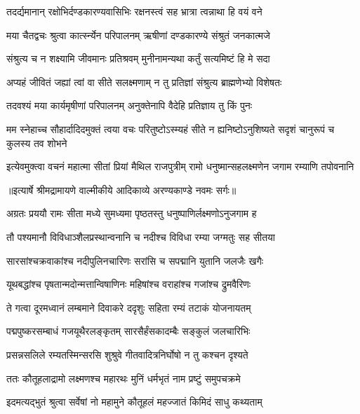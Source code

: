 \twolineshloka
{तदर्द्यमानान् रक्षोभिर्दण्डकारण्यवासिभिः}
{रक्षनस्त्वं सह भ्रात्रा त्वन्नाथा हि वयं वने} %

\twolineshloka
{मया चैतद्वचः श्रुत्वा कार्त्स्न्येन परिपालनम्}
{ऋषीणां दण्डकारण्ये संश्रुतं जनकात्मजे} %

\twolineshloka
{संश्रुत्य च न शक्ष्यामि जीवमानः प्रतिश्रवम्}
{मुनीनामन्यथा कर्तुं सत्यमिष्टं हि मे सदा} %

\twolineshloka
{अप्यहं जीवितं जह्यां त्वां वा सीते सलक्ष्मणाम्}
{न तु प्रतिज्ञां संश्रुत्य ब्राह्मणेभ्यो विशेषतः} %

\twolineshloka
{तदवश्यं मया कार्यमृषीणां परिपालनम्}
{अनुक्तेनापि वैदेहि प्रतिज्ञाय तु किं पुनः} %

\threelineshloka
{मम स्नेहाच्च सौहार्दादिदमुक्तं त्वया वचः}
{परितुष्टोऽस्म्यहं सीते न ह्यनिष्टोऽनुशिष्यते}
{सदृशं चानुरूपं च कुलस्य तव शोभने} %

\fourlineindentedshloka
{इत्येवमुक्त्वा वचनं महात्मा}
{सीतां प्रियां मैथिल राजपुत्रीम्}
{रामो धनुष्मान्सहलक्ष्मणेन}
{जगाम रम्याणि तपोवनानि} %


{॥इत्यार्षे श्रीमद्रामायणे वाल्मीकीये आदिकाव्ये अरण्यकाण्डे नवमः सर्गः॥}


\twolineshloka
{अग्रतः प्रययौ रामः सीता मध्ये सुमध्यमा}
{पृष्ठतस्तु धनुष्पाणिर्लक्ष्मणोऽनुजगाम ह} %

\twolineshloka
{तौ पश्यमानौ विविधाञ्शैलप्रस्थान्वनानि च}
{नदीश्च विविधा रम्या जग्मतुः सह सीतया} %

\twolineshloka
{सारसांश्चक्रवाकांश्च नदीपुलिनचारिणः}
{सरांसि च सपद्मानि युतानि जलजैः खगैः} %

\twolineshloka
{यूथबद्धांश्च पृषतान्मदोन्मत्तान्विषाणिनः}
{महिषांश्च वराहांश्च गजांश्च द्रुमवैरिणः} %

\twolineshloka
{ते गत्वा दूरमध्वानं लम्बमाने दिवाकरे}
{ददृशुः सहिता रम्यं तटाकं योजनायतम्} %

\twolineshloka
{पद्मपुष्करसम्बाधं गजयूथैरलङ्कृतम्}
{सारसैर्हंसकादम्बैः सङ्कुलं जलचारिभिः} %

\twolineshloka
{प्रसन्नसलिले रम्यतस्मिन्सरसि शुश्रुवे}
{गीतवादित्रनिर्घोषो न तु कश्चन दृश्यते} %

\twolineshloka
{ततः कौतूहलाद्रामो लक्ष्मणश्च महारथः}
{मुनिं धर्मभृतं नाम प्रष्टुं समुपचक्रमे} %

\twolineshloka
{इदमत्यद्भुतं श्रुत्वा सर्वेषां नो महामुने}
{कौतूहलं महज्जातं किमिदं साधु कथ्यताम्} %

